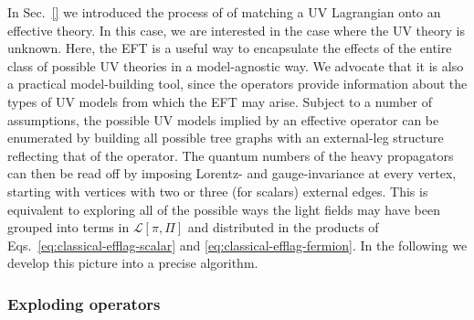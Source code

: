 In Sec.~\ref{} we introduced the process of of matching a UV Lagrangian onto an
effective theory. In this case, we are interested in the case where the UV
theory is unknown. Here, the EFT is a useful way to encapsulate the effects of
the entire class of possible UV theories in a model-agnostic way. We advocate
that it is also a practical model-building tool, since the operators provide
information about the types of UV models from which the EFT may arise. Subject
to a number of assumptions, the possible UV models implied by an effective
operator can be enumerated by building all possible tree graphs with an
external-leg structure reflecting that of the operator. The quantum numbers of
the heavy propagators can then be read off by imposing Lorentz- and
gauge-invariance at every vertex, starting with vertices with two or three (for
scalars) external edges. This is equivalent to exploring all of the possible
ways the light fields may have been grouped into terms in
$\mathscr{L}[\pi, \Pi]$ and distributed in the products of
Eqs.~\eqref{eq:classical-efflag-scalar} and \eqref{eq:classical-efflag-fermion}.
In the following we develop this picture into a precise algorithm.

\subsubsection{Exploding operators}
\label{sec:exploding-operators}

